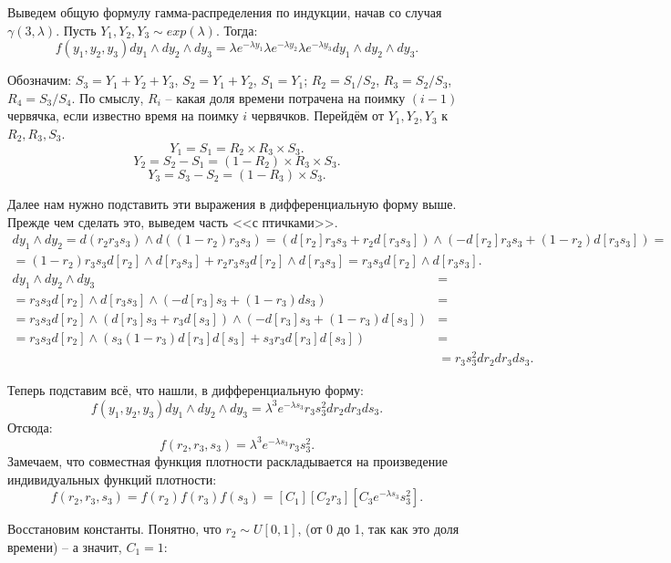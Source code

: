 \documentclass[10pt, a4paper]{extarticle}
\begin{document}
Выведем общую формулу гамма-распределения по индукции, начав со случая $\gamma(3, \lambda)$. Пусть $Y_1, Y_2, Y_3 \sim exp(\lambda)$. Тогда:
\[
f(y_1, y_2, y_3)dy_1 \land dy_2 \land dy_3 = \lambda e^{-\lambda y_1}\lambda e^{-\lambda y_2}\lambda e^{-\lambda y_3}dy_1 \land dy_2 \land dy_3.
\]

Обозначим: $S_3 = Y_1 + Y_2 + Y_3$, $S_2 = Y_1 + Y_2$, $S_1 = Y_1$; $R_2 = S_1 / S_2$, $R_3 = S_2 / S_3$, $R_4 = S_3 / S_4$. По смыслу, $R_i$ -- какая доля времени потрачена на поимку $(i-1)$ червячка, если известно время на поимку $i$ червячков. Перейдём от $Y_1, Y_2, Y_3$ к $R_2, R_3, S_3$. 
\[
Y_1 = S_1 = R_2 \times R_3 \times S_3.
\]
\[
Y_2 = S_2 - S_1 = (1 - R_2) \times R_3 \times S_3.
\]
\[
Y_3 = S_3 - S_2 = (1 - R_3) \times S_3.
\]

Далее нам нужно подставить эти выражения в дифференциальную форму выше. Прежде чем сделать это, выведем часть <<с птичками>>.
\begin{align*}
	dy_1 \land dy_2 = d(r_2r_3s_3) \land d((1-r_2)r_3s_3) = (d[r_2]r_3s_3 + r_2d[r_3s_3]) \land (-d[r_2]r_3s_3 + (1-r_2)d[r_3s_3]) = \\ =
	(1-r_2)r_3s_3d[r_2] \land d[r_3s_3] + r_2r_3s_3d[r_2]\land d[r_3s_3] = r_3s_3 d[r_2] \land d[r_3s_3].
\end{align*}
\begin{align*}
	dy_1 \land dy_2 \land dy_3 &=\\= r_3s_3d[r_2] \land d[r_3s_3] \land (-d[r_3]s_3 + (1-r_3)ds_3) &=\\= r_3s_3d[r_2] \land (d[r_3]s_3 + r_3d[s_3]) \land (-d[r_3]s_3 + (1-r_3)d[s_3]) &=\\= r_3s_3d[r_2] \land (s_3(1-r_3)d[r_3]d[s_3] + s_3r_3d[r_3]d[s_3]) &=\\&= r_3s_3^2dr_2dr_3ds_3.
\end{align*}

Теперь подставим всё, что нашли, в дифференциальную форму:
\[
f(y_1, y_2, y_3)dy_1 \land dy_2 \land dy_3 = \lambda^3e^{-\lambda s_3}r_3s_3^2dr_2dr_3ds_3.
\]
Отсюда:
\[
f(r_2, r_3, s_3) = \lambda^3e^{-\lambda s_3}r_3s_3^2.
\]
Замечаем, что совместная функция плотности раскладывается на произведение индивидуальных функций плотности:
\[
f(r_2, r_3, s_3) = f(r_2)f(r_3)f(s_3) = [C_1][C_2r_3][C_3e^{-\lambda s_3}s_3^2].
\]

Восстановим константы. Понятно, что $r_2 \sim U[0, 1]$, (от 0 до 1, так как это доля времени) -- а значит, $C_1 = 1$:
\end{document}
